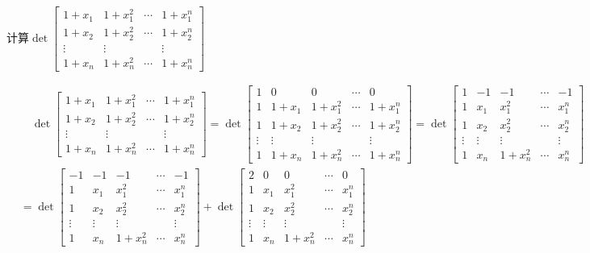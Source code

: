                 \begin{example}
                    计算$\det\begin{bmatrix}1+x_1&1+x_{1}^2&\cdots&1+x_{1}^{n}\\1+x_2&1+x_{2}^2&\cdots&1+x_{2}^{n}\\\vdots&\vdots&&\vdots\\1+x_n&1+x_{n}^2&\cdots&1+x_{n}^{n}\end{bmatrix} $
                \end{example}

                \begin{solution}
                    \begin{align*}
                            &\quad\det\begin{bmatrix}1+x_1&1+x_{1}^2&\cdots&1+x_{1}^{n}\\1+x_2&1+x_{2}^2&\cdots&1+x_{2}^{n}\\\vdots&\vdots&&\vdots\\1+x_n&1+x_{n}^2&\cdots&1+x_{n}^{n}\end{bmatrix}=\det\begin{bmatrix}1&0&0&\cdots&0\\1&1+x_1&1+x_{1}^2&\cdots&1+x_{1}^{n}\\1&1+x_2&1+x_{2}^2&\cdots&1+x_{2}^{n}\\\vdots&\vdots&\vdots&&\vdots\\1&1+x_n&1+x_{n}^2&\cdots&1+x_{n}^{n}\end{bmatrix}=\det\begin{bmatrix}1&-1&-1&\cdots&-1\\1&x_1&x_{1}^2&\cdots&x_{1}^{n}\\1&x_2&x_{2}^2&\cdots&x_{2}^{n}\\\vdots&\vdots&\vdots&&\vdots\\1&x_n&1+x_{n}^2&\cdots&x_{n}^{n}\end{bmatrix} \\
                            &=\det\begin{bmatrix}-1&-1&-1&\cdots&-1\\1&x_1&x_{1}^2&\cdots&x_{1}^{n}\\1&x_2&x_{2}^2&\cdots&x_{2}^{n}\\\vdots&\vdots&\vdots&&\vdots\\1&x_n&1+x_{n}^2&\cdots&x_{n}^{n}\end{bmatrix}+\det\begin{bmatrix}2&0&0&\cdots&0\\1&x_1&x_{1}^2&\cdots&x_{1}^{n}\\1&x_2&x_{2}^2&\cdots&x_{2}^{n}\\\vdots&\vdots&\vdots&&\vdots\\1&x_n&1+x_{n}^2&\cdots&x_{n}^{n}\end{bmatrix} \\

\end{align*}
\end{solution}
